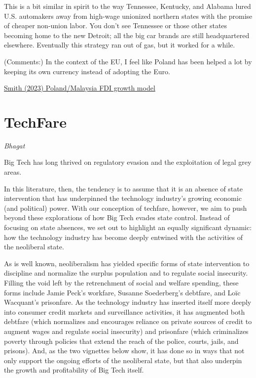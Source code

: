 \documentclass[
]{book}
\begin{document}
This is a bit similar in spirit to the way Tennessee, Kentucky, and Alabama lured U.S. automakers away from high-wage unionized northern states with the promise of cheaper non-union labor. You don't see Tennessee or those other states becoming home to the new Detroit; all the big car brands are still headquartered elsewhere. Eventually this strategy ran out of gas, but it worked for a while.

(Comments:) In the context of the EU, I feel like Poland has been helped a lot by keeping its own currency instead of adopting the Euro.

\href{https://noahpinion.substack.com/p/the-polandmalaysia-model}{Smith (2023) Poland/Malaysia FDI growth model}

\hypertarget{techfare}{%
\section{TechFare}\label{techfare}}

\emph{Bhagat}

Big Tech has long thrived on regulatory evasion and the exploitation of legal grey areas.

In this literature, then, the tendency is to assume that it is an absence of state intervention that has underpinned the technology industry's growing economic (and political) power. With our conception of techfare, however, we aim to push beyond these explorations of how Big Tech evades state control. Instead of focusing on state absences, we set out to highlight an equally significant dynamic: how the technology industry has become deeply entwined with the activities of the neoliberal state.

As is well known, neoliberalism has yielded specific forms of state intervention to discipline and normalize the surplus population and to regulate social insecurity. Filling the void left by the retrenchment of social and welfare spending, these forms include Jamie Peck's workfare, Susanne Soederberg's debtfare, and Loïc Wacquant's prisonfare. As the technology industry has inserted itself more deeply into consumer credit markets and surveillance activities, it has augmented both debtfare (which normalizes and encourages reliance on private sources of credit to augment wages and regulate social insecurity) and prisonfare (which criminalizes poverty through policies that extend the reach of the police, courts, jails, and prisons). And, as the two vignettes below show, it has done so in ways that not only support the ongoing efforts of the neoliberal state, but that also underpin the growth and profitability of Big Tech itself.
\end{document}

